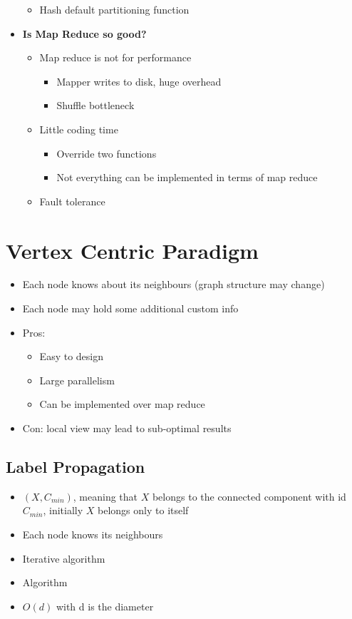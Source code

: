 \documentclass[12pt,oneside]{report}
\begin{document}
\begin{itemize}
\begin{itemize}
        \item Hash default partitioning function
    \end{itemize}
    \item \textbf{Is Map Reduce so good?}
    \begin{itemize}
        \item Map reduce is not for performance
        \begin{itemize}
            \item Mapper writes to disk, huge overhead
            \item Shuffle bottleneck
        \end{itemize}
        \item Little coding time
        \begin{itemize}
            \item Override two functions
            \item Not everything can be implemented in terms of map reduce
        \end{itemize}
        \item Fault tolerance
    \end{itemize}
\end{itemize}


\chapter{Vertex Centric Paradigm}
\begin{itemize}
    \item Each node knows about its neighbours (graph structure may change)
    \item Each node may hold some additional custom info
    \item Pros:
    \begin{itemize}
        \item Easy to design
        \item Large parallelism
        \item Can be implemented over map reduce
    \end{itemize}
    \item Con: local view may lead to sub-optimal results
\end{itemize}

\section{Label Propagation}
\begin{itemize}
    \item \((X, C_{min})\), meaning that \(X\) belongs to the connected component with id \(C_{min}\), initially \(X\) belongs only to itself
    \item Each node knows its neighbours
    \item Iterative algorithm
    \item Algorithm
    \item \(O(d)\) with d is the diameter
\end{itemize}
\end{document}

